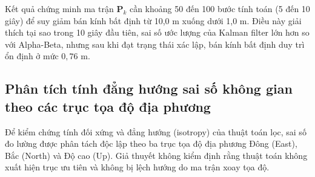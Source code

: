 Kết quả chứng minh ma trận $\mathbf{P}_k$ cần khoảng 50 đến 100 bước tính toán (5 đến 10 giây) để suy giảm bán kính bất định từ 10,0 m xuống dưới 1,0 m. Điều này giải thích tại sao trong 10 giây đầu tiên, sai số ước lượng của Kalman filter lớn hơn so với Alpha-Beta, nhưng sau khi đạt trạng thái xác lập, bán kính bất định duy trì ổn định ở mức $0{,}76$ m.

\subsection{Phân tích tính đẳng hướng sai số không gian theo các trục tọa độ địa phương}

\hspace{0.5cm} Để kiểm chứng tính đối xứng và đẳng hướng (isotropy) của thuật toán lọc, sai số đo lường được phân tách độc lập theo ba trục tọa độ địa phương Đông (East), Bắc (North) và Độ cao (Up). Giả thuyết không kiểm định rằng thuật toán không xuất hiện trục ưu tiên và không bị lệch hướng do ma trận xoay tọa độ.

\begin{table}[H]
\centering
\caption{Phân rã sai số vị trí theo các trục không gian độc lập qua 10 seed ($n=10$)}
\label{tab:spatial-error-axes}
\end{table}

